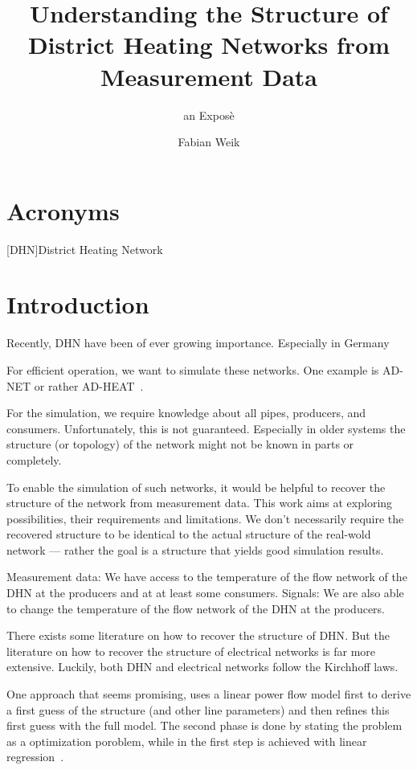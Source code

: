\documentclass{scrartcl}
\title{Understanding the Structure of District Heating Networks from Measurement Data}
\subtitle{an Exposè}
\author{Fabian Weik}
\begin{document}
    \maketitle

    \section{Acronyms}

    \begin{acronym}
        [DHN]{District Heating Network}
    \end{acronym}

    \section{Introduction}

    Recently, \ac{DHN} have been of ever growing importance.
    Especially in Germany

    For efficient operation, we want to simulate these networks.
    One example is AD-NET or rather AD-HEAT~\cite{adnetheat}.

    For the simulation, we require knowledge about all pipes, producers, and consumers.
    Unfortunately, this is not guaranteed.
    Especially in older systems the structure (or topology) of the network might not be known in parts or completely.

    To enable the simulation of such networks, it would be helpful to recover the structure of the network from measurement data.
    This work aims at exploring possibilities, their requirements and limitations.
    We don't necessarily require the recovered structure to be identical to the actual structure of the real-wold network --- rather  the goal is a structure that yields good simulation results.

    Measurement data: We have access to the temperature of the flow network of the \ac{DHN} at the producers and at at least some consumers.
    Signals: We are also able to change the temperature of the flow network of the \ac{DHN} at the producers.

    There exists some literature on how to recover the structure of \ac{DHN}.
    But the literature on how to recover the structure of electrical networks is far more extensive.
    Luckily, both \ac{DHN} and electrical networks follow the Kirchhoff laws.

    One approach that seems promising, uses a linear power flow model first to derive a first guess of the structure (and other line parameters) and then refines this first guess with the full model.
    The second phase is done by stating the problem as a optimization poroblem, while in the first step is achieved with linear regression~\cite{wang2024identification}.

    \printbibliography
\end{document}
